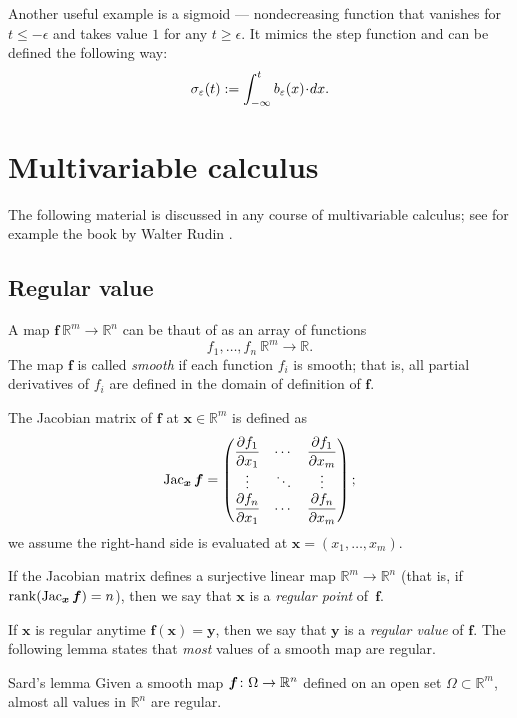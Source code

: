 Another useful example is a sigmoid --- nondecreasing function that vanishes for $t\le -\epsilon$ and takes value $1$ for any $t\ge \epsilon$.
It mimics the step function and can be defined the following way: \label{page:sigma-function}
\[\sigma_\epsilon(t)
\df 
\int_{-\infty}^t b_\epsilon(x)\cdot dx.\]

\section{Multivariable calculus}

The following material is discussed in any course of multivariable calculus;
see for example the book by Walter Rudin \cite{rudin}.

\subsection*{Regular value}

A map $\bm{f}\:\mathbb{R}^m\to\mathbb{R}^n$ can be thaut of as an array of functions 
\[f_1,\dots,f_n\:\mathbb{R}^m\to \mathbb{R}.\]
The map $\bm{f}$ is called \emph{smooth} if each function $f_i$ is smooth;
that is, all partial derivatives of $f_i$ are defined in the domain of definition of $\bm{f}$.

The Jacobian matrix of $\bm{f}$ at $\bm{x}\in\mathbb{R}^m$ is defined as 
\[\mathop{\rm Jac}\nolimits_{\bm{x}}\bm{f}=
\begin{pmatrix}
\dfrac{\partial f_1}{\partial x_1} & \cdots & \dfrac{\partial f_1}{\partial x_m}\\
\vdots & \ddots & \vdots\\
\dfrac{\partial f_n}{\partial x_1} & \cdots & \dfrac{\partial f_n}{\partial x_m} \end{pmatrix};\]
we assume the right-hand side is evaluated at $\bm{x}=(x_1,\dots,x_m)$.

If the Jacobian matrix defines a surjective linear map $\mathbb{R}^m\to\mathbb{R}^n$ (that is, if $\mathop{\rm rank}\nolimits(\mathop{\rm Jac}\nolimits_{\bm{x}}\bm{f})=n$), then we say that 
$\bm{x}$ is a \emph{regular point} of~$\bm{f}$.

If $\bm{x}$ is regular anytime $\bm{f}(\bm{x})=\bm{y}$,
then we say that $\bm{y}$ is a \emph{regular value} of $\bm{f}$.
The following lemma states that \textit{most} values of a smooth map are regular.

\begin{thm}{Sard's lemma}\label{lem:sard}
Given a smooth map $\bm{f}\colon \Omega \z\to \mathbb{R}^n$ defined on an open set $\Omega\subset \mathbb{R}^m$, almost all values in $\mathbb{R}^n$ are regular.
\end{thm}

